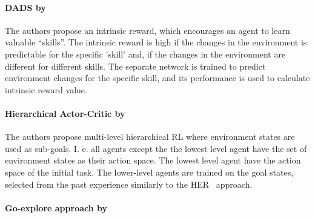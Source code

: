 \documentclass[acmsmall, nonacm]{acmart}
\begin{document}

\paragraph{DADS by~\citet{Sharma2020DynamicsAwareUD}} %
\label{par:dads}

The authors propose an intrinsic reward, which encourages an agent to learn valuable ``skills''. The intrinsic reward is high if the changes in the environment is predictable for the specific 'skill' and, if the changes in the environment are different for different skills. The separate network is trained to predict environment changes for the specific skill, and its performance is used to calculate intrinsic reward value.


\paragraph{Hierarchical Actor-Critic by~\citet{levy2018hierarchical}} %
\label{par:hierarchical_ac}



The authors propose multi-level hierarchical RL where environment states are used as sub-goals. I. e. all agents except the the lowest level agent have the set of environment states as their action space. The lowest level agent have the action space of the initial task. The lower-level agents are trained on the goal states, selected from the past experience similarly to the HER~\cite{andrychowicz_hindsight_2017} approach.


\paragraph{Go-explore approach by~\citet{ecoffet_first_2021}} %
\label{par:go-explore}
\end{document}
